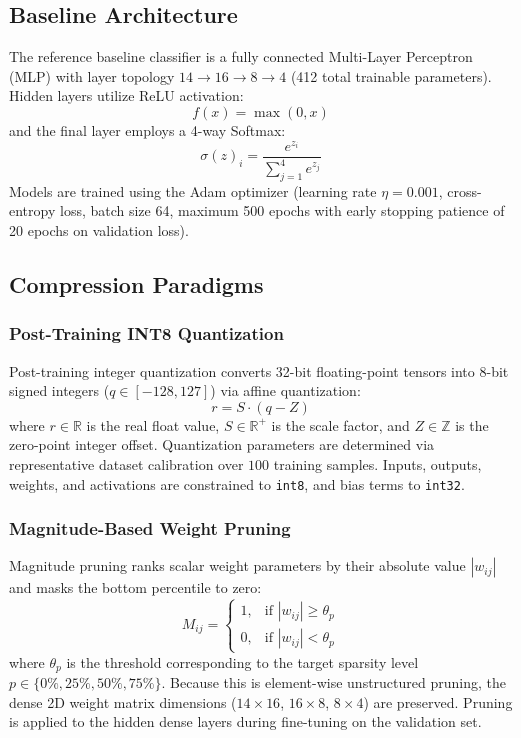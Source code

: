 \documentclass[journal,10pt]{IEEEtran}
\begin{document}
\subsection{Baseline Architecture}
The reference baseline classifier is a fully connected Multi-Layer Perceptron (MLP) with layer topology $14 \rightarrow 16 \rightarrow 8 \rightarrow 4$ (412 total trainable parameters). Hidden layers utilize ReLU activation:
\begin{equation}
    f(x) = \max(0, x)
\end{equation}
and the final layer employs a 4-way Softmax:
\begin{equation}
    \sigma(z)_i = \frac{e^{z_i}}{\sum_{j=1}^4 e^{z_j}}
\end{equation}
Models are trained using the Adam optimizer (learning rate $\eta = 0.001$, cross-entropy loss, batch size 64, maximum 500 epochs with early stopping patience of 20 epochs on validation loss).

\subsection{Compression Paradigms}

\subsubsection{Post-Training INT8 Quantization}
Post-training integer quantization converts 32-bit floating-point tensors into 8-bit signed integers ($q \in [-128, 127]$) via affine quantization:
\begin{equation}
    r = S \cdot (q - Z)
\end{equation}
where $r \in \mathbb{R}$ is the real float value, $S \in \mathbb{R}^+$ is the scale factor, and $Z \in \mathbb{Z}$ is the zero-point integer offset. Quantization parameters are determined via representative dataset calibration over $100$ training samples. Inputs, outputs, weights, and activations are constrained to \texttt{int8}, and bias terms to \texttt{int32}.

\subsubsection{Magnitude-Based Weight Pruning}
Magnitude pruning ranks scalar weight parameters by their absolute value $|w_{ij}|$ and masks the bottom percentile to zero:
\begin{equation}
    M_{ij} = \begin{cases} 
    1, & \text{if } |w_{ij}| \ge \theta_p \\
    0, & \text{if } |w_{ij}| < \theta_p 
    \end{cases}
\end{equation}
where $\theta_p$ is the threshold corresponding to the target sparsity level $p \in \{0\%, 25\%, 50\%, 75\%\}$. Because this is element-wise unstructured pruning, the dense 2D weight matrix dimensions ($14 \times 16$, $16 \times 8$, $8 \times 4$) are preserved. Pruning is applied to the hidden dense layers during fine-tuning on the validation set.
\end{document}
